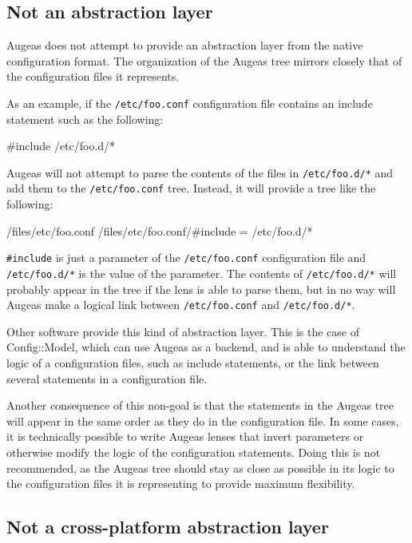 \subsection{Not an abstraction layer}

Augeas does not attempt to provide an abstraction layer from the native configuration format. The organization of the Augeas tree mirrors closely that of the configuration files it represents.

As an example, if the \nolinkurl{/etc/foo.conf} configuration file contains an include statement such as the following:

\begin{bash}[]
#include /etc/foo.d/*
\end{bash}

Augeas will not attempt to parse the contents of the files in \nolinkurl{/etc/foo.d/*} and add them to the \nolinkurl{/etc/foo.conf} tree. Instead, it will provide a tree like the following:

\begin{augtoolsh}[]
/files/etc/foo.conf
/files/etc/foo.conf/#include = /etc/foo.d/*
\end{augtoolsh}

\verb!#include! is just a parameter of the \nolinkurl{/etc/foo.conf} configuration file and \nolinkurl{/etc/foo.d/*} is the value of the parameter. The contents of \nolinkurl{/etc/foo.d/*} will probably appear in the tree if the lens is able to parse them, but in no way will Augeas make a logical link between \nolinkurl{/etc/foo.conf} and \nolinkurl{/etc/foo.d/*}.

Other software provide this kind of abstraction layer. This is the case of Config::Model, which can use Augeas as a backend, and is able to understand the logic of a configuration files, such as include statements, or the link between several statements in a configuration file.

Another consequence of this non-goal is that the statements in the Augeas tree will appear in the same order as they do in the configuration file. In some cases, it is technically possible to write Augeas lenses that invert parameters or otherwise modify the logic of the configuration statements. Doing this is not recommended, as the Augeas tree should stay as close as possible in its logic to the configuration files it is representing to provide maximum flexibility.

\subsection{Not a cross-platform abstraction layer}

